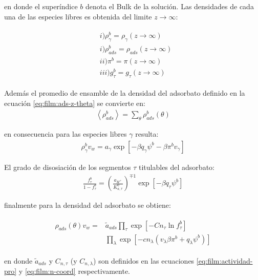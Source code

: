 \noindent en donde el super\'indice $b$ denota el Bulk de la soluci\'on. 
Las densidades de cada una de las especies libres es obtenida del limite  $z \to \infty$:

\begin{align}
	\begin{aligned}
		& i)\rho^b_\gamma =\rho_\gamma (z \rightarrow \infty)   \\
		& i)\rho^b_{ads} =\rho_{ads} (z \rightarrow \infty)   \\
		& ii)  \pi^b = \pi(z \rightarrow \infty) \\
		& iii) g_\tau^b = g_\tau(z \rightarrow \infty)  
	\end{aligned}
\end{align}

Adem\'as el promedio de ensamble de la densidad del adsorbato definido en la ecuaci\'on \ref{eq:film:ads-z-theta} se convierte en:
\begin{align}
	\left<\rho^b_{ads}\right> = \sum_{\theta}\rho^b_{ads}(\theta)
\end{align}

en consecuencia para las especies libres $\gamma$ resulta:
\begin{align}
	\rho^b_\gamma v_w = a_\gamma \exp\left[ -\beta q_\gamma \psi^b -\beta \pi^b v_\gamma \right]
	\label{eq:film:rhofree-bulk}
\end{align}

El grado de disosiaci\'on de los segmentos $\tau$ titulables del adsorbato:
\begin{align}
		\frac{f^b_\tau}{1-f^b_\tau} = \left(\frac{a_{H^+}}{K^0_{a,\tau}}\right)^{\mp 1} \exp[-\beta q_\tau \psi^b]
\end{align}


finalmente para la densidad del adsorbato se obtiene:

\begin{align}
	\begin{aligned}
		\rho_{ads}(\theta)v_w = &\tilde{a}_{ads} \prod_\tau \exp\left[-Cn_\tau \ln f^b_\tau\right] \\
		& \prod_\lambda \exp \left[-cn_\lambda (v_\lambda\beta\pi^b + q_\lambda \psi^b) \right]
	\end{aligned}
	\label{eq:film:rhopro-bulk}
\end{align}

\noindent en donde $\tilde{a}_{ads}$ y $C_{n,\tau}$ (y $C_{n,\lambda}$) son definidos en las ecuaciones  \ref{eq:film:actividad-pro} y \ref{eq:film:n-coord} respectivamente. 

